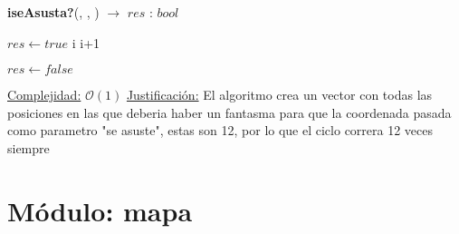 \documentclass[10pt,a4paper]{article}
\begin{document}
\begin{Algoritmos}
\begin{algorithm}[H]{\textbf{iseAsusta?}(, , ) $\to$ $res$ : $bool$}
\begin{algorithmic}
                        \State $res \gets true$
                    \EndIf
                    \State i \gets i+1
            \EndIf

			\EndWhile
			
			\State $res \gets false$
    	
		\medskip
		\Statex \underline{Complejidad:} $\mathcal{O}(1)$
		\Statex \underline{Justificación:} El algoritmo crea un vector con todas las posiciones en las que deberia haber un fantasma para que la coordenada pasada como parametro "se asuste", estas son 12, por lo que el ciclo correra 12 veces siempre
    \end{algorithmic}
\end{algorithm}	

\end{Algoritmos}
\section{Módulo: mapa}
\end{document}
